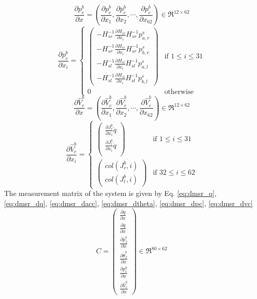 \documentclass[12pt]{article}
\def\dfdx#1#2{\frac{\partial {#1}}{\partial {#2}}}
\begin{document}
\begin{equation}
\label{eq:dmsr_dpc}
\dfdx{p_{c}^{b}}{x} = \left(\dfdx{p_{c}^{b}}{x_{1}}, \dfdx{p_{c}^{b}}{x_{2}}, \cdots , \dfdx{p_{c}^{b}}{x_{62}}\right) \in \Re^{12 \times 62}
\end{equation}
\[
\dfdx{p_{c}^{b}}{x_{i}} =
\begin{cases}
\left(
\begin{aligned}
-H_{sr}^{-1}\dfdx{H_{sr}}{x_{i}}H_{sr}^{-1}p_{a,r}^{s} \\
-H_{sr}^{-1}\dfdx{H_{sr}}{x_{i}}H_{sr}^{-1}p_{b,r}^{s} \\
-H_{sl}^{-1}\dfdx{H_{sl}}{x_{i}}H_{sl}^{-1}p_{a,l}^{s} \\
-H_{sl}^{-1}\dfdx{H_{sl}}{x_{i}}H_{sl}^{-1}p_{b,l}^{s}
\end{aligned} \right)
& \text{if } 1 \leq i \leq 31 \\
0 &\text{otherwise}
\end{cases}
\]
 \begin{equation}
 \label{eq:dmsr_dvc}
\dfdx{\hat{V}_{c}^{b}}{x} = \left(\dfdx{\hat{V}_{c}^{b}}{x_{1}}, \dfdx{\hat{V}_{c}^{b}}{x_{2}}, \cdots , \dfdx{\hat{V}_{c}^{b}}{x_{62}}\right) \in \Re^{12 \times 62}
\end{equation}
\[
\dfdx{\hat{V}_{c}^{b}}{x_{i}} = 
	\begin{cases}
	\left(
	\begin{aligned}
	\dfdx{J_{r}^{b}}{x_{i}}\dot{q} \\
	\dfdx{J_{l}^{b}}{x_{i}}\dot{q} \\
	\end{aligned} \right)
	& \text{if } 1 \leq i \leq 31 \\
	\begin{pmatrix}
	col(J_{r}^{b},i)\\ col(J_{l}^{b},i)
	\end{pmatrix}
	 	& \text{if } 32 \leq i \leq 62
	\end{cases}
\]
The measurement matrix of the system is given by Eq. \ref{eq:dmsr_q}, \ref{eq:dmsr_dq}, \ref{eq:dmsr_dacc}, \ref{eq:dmsr_dtheta}, \ref{eq:dmsr_dpc}, \ref{eq:dmsr_dvc}
\begin{equation}
C = \left(
   \begin{aligned}
   \dfdx{q}{x} \\
	 \dfdx{\dot{q}}{x}\\
	 \dfdx{\ddot{p}_{f}^{b}}{x}\\
	 \dfdx{\dot{\theta}_{f}^{b}}{x}\\
	 \dfdx{p_{c}^{b}}{x}\\
	 \dfdx{\hat{V}_{c}^{b}}{x} 
   \end{aligned}
	 \right) \in \Re^{80 \times 62}
\end{equation}
\end{document}
